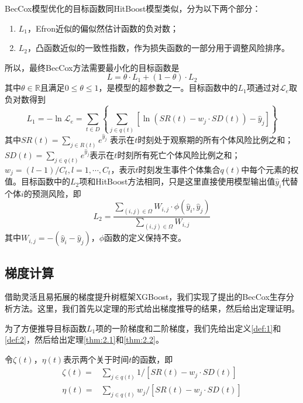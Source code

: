 BecCox模型优化的目标函数同HitBoost模型类似，分为以下两个部分：
\begin{enumerate}
	\item $L_1$，Efron近似的偏似然估计函数的负对数；
	\item $L_2$，凸函数近似的一致性指数，作为损失函数的一部分用于调整风险排序。
\end{enumerate}
所以，最终BecCox方法需要最小化的目标函数是
\begin{equation}
L = \theta \cdot L_1 + (1- \theta) \cdot L_2
\end{equation}
其中$\theta \in \mathbb{R}$且满足$0 \le \theta \le 1$，是模型的超参数之一。目标函数中的$L_1$项通过对$\mathcal{L}_e$取负对数得到
\begin{equation}
L_1 = -\ln\mathcal{L}_e = \sum_{t\in D} \left\{ \sum_{j\in q(t)} [\ln(SR(t)-w_j\cdot SD(t))-\hat{y}_j] \right\}
\end{equation}
其中$SR(t)=\sum_{j\in R(t)} e^{\hat{y}_j}$ 表示在$t$时刻处于观察期的所有个体风险比例之和；$SD(t)=\sum_{j\in q(t)} e^{\hat{y}_j}$表示在$t$时刻所有死亡个体风险比例之和；$w_j=(l-1)/C_t, l=1,\cdots,C_t$，表示$t$时刻发生事件个体集合$q(t)$中每个元素的权值。目标函数中的$L_2$项和HitBoost方法相同，只是这里直接使用模型输出值$\hat{y}_i$代替个体$i$的预测风险，即
\begin{equation}
L_2 = \frac{\sum_{(i,j)\in \Omega} W_{i,j}\cdot \phi(\hat{y}_i, \hat{y}_j)}{\sum_{(i,j)\in \Omega} W_{i,j}}
\end{equation}
其中$W_{i,j}=-(\hat{y}_i-\hat{y}_j)$，$\phi$函数的定义保持不变。

\subsection{梯度计算}

借助灵活且易拓展的梯度提升树框架XGBoost，我们实现了提出的BecCox生存分析方法。这里，我们首先以定理的形式给出梯度推导的结果，然后给出定理证明。

为了方便推导目标函数$L_1$项的一阶梯度和二阶梯度，我们先给出定义\ref{def:1}和\ref{def:2}，然后给出定理\ref{thm:2.1}和\ref{thm:2.2}。

\begin{definition}\label{def:1}
令$\zeta(t)$，$\eta(t)$表示两个关于时间$t$的函数，即\[
\begin{split}
\zeta(t) =& \sum_{j\in q(t)} 1/[SR(t) - w_j\cdot SD(t)] \\
\eta(t)  =& \sum_{j\in q(t)} w_j/[SR(t) - w_j\cdot SD(t)]
\end{split}
\]
\end{definition}

